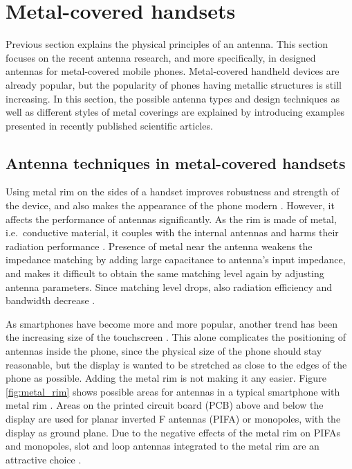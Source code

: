 \section{Metal-covered handsets}
\label{sec:metal_cover}
Previous section explains the physical principles of an antenna. This section focuses on the recent antenna research, and more specifically, in designed antennas for metal-covered mobile phones. Metal-covered handheld devices are already popular, but the popularity of phones having metallic structures is still increasing. In this section, the possible antenna types and design techniques as well as different styles of metal coverings are explained by introducing examples presented in recently published scientific articles.

\subsection{Antenna techniques in metal-covered handsets}
\label{sec:metal_rim}
Using metal rim on the sides of a handset improves robustness and strength of the device, and also makes the appearance of the phone modern \cite{ban_dual_loop, hsu_compact, yuan_slot}. However, it affects the performance of antennas significantly. As the rim is made of metal, i.e.\ conductive material, it couples with the internal antennas and harms their radiation performance \cite{ban_dual_loop}. Presence of metal near the antenna weakens the impedance matching by adding large capacitance to antenna's input impedance, and makes it difficult to obtain the same matching level again by adjusting antenna parameters. Since matching level drops, also radiation efficiency and bandwidth decrease \cite{ban_dual_loop, hsu_compact, yuan_slot}.

As smartphones have become more and more popular, another trend has been the increasing size of the touchscreen \cite{ban_low_profile}. This alone complicates the positioning of antennas inside the phone, since the physical size of the phone should stay reasonable, but the display is wanted to be stretched as close to the edges of the phone as possible. Adding the metal rim is not making it any easier. Figure \ref{fig:metal_rim} shows possible areas for antennas in a typical smartphone with metal rim \cite{hsu_compact}. Areas on the printed circuit board (PCB) above and below the display are used for planar inverted F antennas (PIFA) or monopoles, with the display as ground plane. Due to the negative effects of the metal rim on PIFAs and monopoles, slot and loop antennas integrated to the metal rim are an attractive choice \cite{hsu_compact, ban_dual_loop}.

